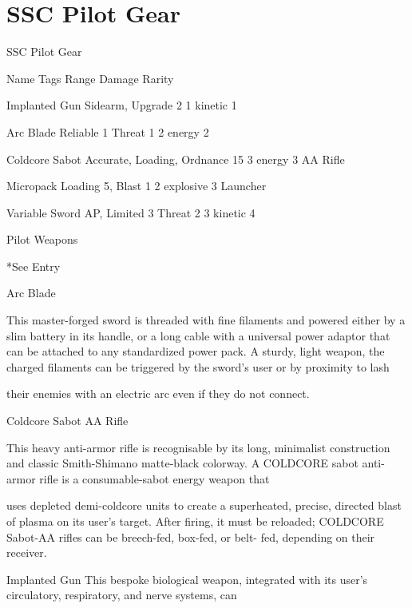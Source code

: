 \section{SSC Pilot Gear}

                                                SSC Pilot Gear

  Name                  Tags                                       Range            Damage                     Rarity

 Implanted Gun          Sidearm, Upgrade                           2                1 kinetic                  1

 Arc Blade              Reliable 1                                 Threat 1         2 energy                   2

 Coldcore Sabot         Accurate, Loading, Ordnance                15               3 energy                   3
 AA Rifle

 Micropack              Loading                                    5, Blast 1       2 explosive                3
 Launcher

  Variable Sword        AP, Limited 3                              Threat 2         3 kinetic                  4

                                                    Pilot Weapons

*See Entry


Arc Blade

This master-forged sword is threaded with fine filaments and powered either by a slim battery in its handle,
or a long cable with a universal power adaptor that can be attached to any standardized power pack. A
sturdy, light weapon, the charged filaments can be triggered by the sword’s user or by proximity to lash

their enemies with an electric arc even if they do not connect.


Coldcore Sabot AA Rifle

This heavy anti-armor rifle is recognisable by its long, minimalist construction and classic Smith-Shimano
matte-black colorway. A COLDCORE sabot anti-armor rifle is a consumable-sabot energy weapon that

uses depleted demi-coldcore units to create a superheated, precise, directed blast of plasma on its user’s
target. After firing, it must be reloaded; COLDCORE Sabot-AA rifles can be breech-fed, box-fed, or belt-
fed, depending on their receiver.

Implanted Gun
This bespoke biological weapon, integrated with its user’s circulatory, respiratory, and nerve systems, can

